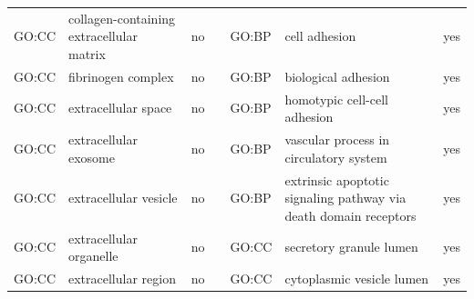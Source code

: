 \begin{longtable}{@{}lp{5cm}lllp{5cm}l@{}}
GO:CC           & collagen-containing extracellular matrix                                                                                           & no               &           & GO:BP           & cell adhesion                                                                                                                                                          & yes              \\
GO:CC           & fibrinogen complex                                                                                                                 & no               &           & GO:BP           & biological adhesion                                                                                                                                                    & yes              \\
GO:CC           & extracellular space                                                                                                                & no               &           & GO:BP           & homotypic cell-cell adhesion                                                                                                                                           & yes              \\
GO:CC           & extracellular exosome                                                                                                              & no               &           & GO:BP           & vascular process in circulatory system                                                                                                                                 & yes              \\
GO:CC           & extracellular vesicle                                                                                                              & no               &           & GO:BP           & extrinsic apoptotic signaling pathway via death domain receptors                                                                                                       & yes              \\
GO:CC           & extracellular organelle                                                                                                            & no               &           & GO:CC           & secretory granule lumen                                                                                                                                                & yes              \\
GO:CC           & extracellular region                                                                                                               & no               &           & GO:CC           & cytoplasmic vesicle lumen                                                                                                                                              & yes              \\

\end{longtable}
